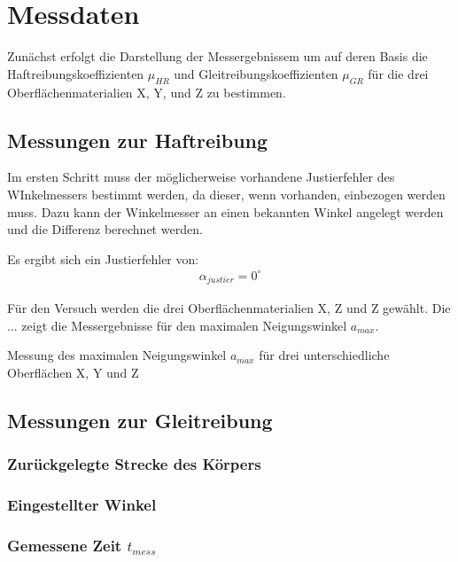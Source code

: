 \section{Messdaten}

Zunächst erfolgt die Darstellung der Messergebnissem um auf deren Basis die Haftreibungskoeffizienten $\mu_{HR}$ und Gleitreibungskoeffizienten $\mu_{GR}$ für die drei Oberflächenmaterialien X, Y, und Z zu bestimmen.

\subsection{Messungen zur Haftreibung}

Im ersten Schritt muss der möglicherweise vorhandene Justierfehler des WInkelmessers bestimmt werden, da dieser, wenn vorhanden, einbezogen werden muss. Dazu kann der Winkelmesser an einen bekannten Winkel angelegt werden und die Differenz berechnet werden. 

Es ergibt sich ein Justierfehler von:
\begin{align*}
    \alpha_{justier} = 0^\circ
\end{align*}

Für den Versuch werden die drei Oberflächenmaterialien X, Z und Z gewählt. Die ... zeigt die Messergebnisse für den maximalen Neigungswinkel $a_{max}$.

\begin{table}[h]
    \center
    \caption[Messung des maximalen Neigungswinkel]{Messung des maximalen Neigungswinkel $a_{max}$ für drei unterschiedliche Oberflächen X, Y und Z}
    
    \label{tab:maximalerNeigungswinkel}
\end{table}

\subsection{Messungen zur Gleitreibung}

\subsubsection{Zurückgelegte Strecke des Körpers}

\subsubsection{Eingestellter Winkel}

\subsubsection{Gemessene Zeit $t_{mess}$}